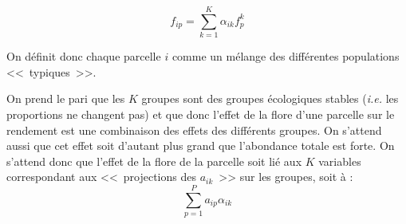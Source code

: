 \documentclass[a4paper, 12pt]{article}
\begin{document}
\[
  f_{ip} = \sum_{k=1}^{K} \alpha _{ik}f_{p}^{k}
\]

On définit donc chaque parcelle $i$ comme un mélange des différentes populations
<<~typiques~>>.

On prend le pari que les $K$ groupes sont des groupes écologiques stables
(\textit{i.e.} les proportions ne changent pas) et que donc l'effet de la flore
d'une parcelle sur le rendement est une combinaison des effets des différents
groupes.
On s'attend aussi que cet effet soit d'autant plus grand que l'abondance totale
est forte.
On s'attend donc que l'effet de la flore de la parcelle soit lié aux $K$
variables correspondant aux <<~projections des $a_{ik}$~>> sur les groupes, soit
à :
\[
  \sum_{p=1}^{P} a_{ip} \alpha _{ik}
\]



\end{document}
